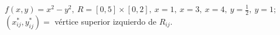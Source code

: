 \item $f(x, y) = x^2 - y^2, \ R = [0, 5] \times [0, 2], \ x = 1, \ x = 3, \ x = 4, \ y = \frac{1}{2}, \ y = 1$; \\ $(x_{ij}^*, y_{ij}^*) =$ vértice superior izquierdo de $R_{ij}$.
